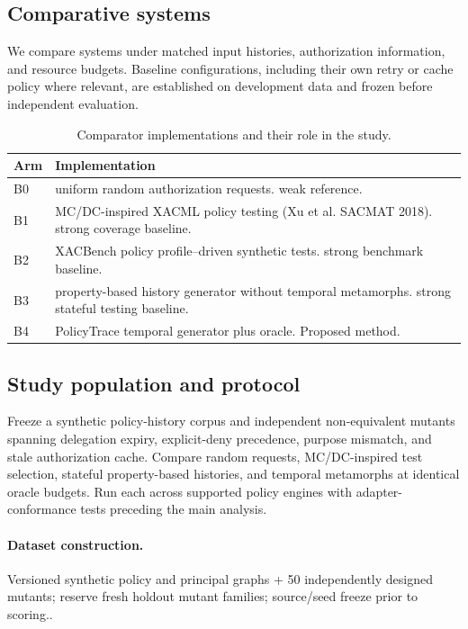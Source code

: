 \documentclass[11pt,a4paper]{article}
\begin{document}
\subsection{Comparative systems}
We compare systems under matched input histories, authorization information, and resource budgets. Baseline configurations, including their own retry or cache policy where relevant, are established on development data and frozen before independent evaluation.
\begin{table}[ht]
\centering\footnotesize
\caption{Comparator implementations and their role in the study.}
\begin{tabularx}{\linewidth}{@{}lX@{}}\toprule
Arm & Implementation \\ \midrule
B0 & uniform random authorization requests. weak reference. \\ 
B1 & MC/DC-inspired XACML policy testing (Xu et al. SACMAT 2018). strong coverage baseline. \\ 
B2 & XACBench policy profile–driven synthetic tests. strong benchmark baseline. \\ 
B3 & property-based history generator without temporal metamorphs. strong stateful testing baseline. \\ 
B4 & PolicyTrace temporal generator plus oracle. Proposed method. \\ 
\bottomrule\end{tabularx}
\end{table}

\subsection{Study population and protocol}
Freeze a synthetic policy-history corpus and independent non-equivalent mutants spanning delegation expiry, explicit-deny precedence, purpose mismatch, and stale authorization cache. Compare random requests, MC/DC-inspired test selection, stateful property-based histories, and temporal metamorphs at identical oracle budgets. Run each across supported policy engines with adapter-conformance tests preceding the main analysis.

\paragraph{Dataset construction.} Versioned synthetic policy and principal graphs + 50 independently designed mutants; reserve fresh holdout mutant families; source/seed freeze prior to scoring..
\end{document}
